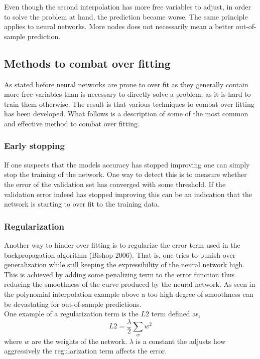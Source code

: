 \documentclass[11pt, letterpaper]{amsart}
\begin{document}
Even though the second interpolation has more free variables to adjust, in order to solve the problem at hand, the prediction became worse. The same principle applies to neural networks. More nodes does not necessarily mean a better out-of-sample prediction.

\subsection{Methods to combat over fitting}
As stated before neural networks are prone to over fit as they generally contain more free variables than is necessary to directly solve a problem, as it is hard to train them otherwise. The result is that various techniques to combat over fitting has been developed. What follows is a description of some of the most common and effective method to combat over fitting.

\subsubsection{Early stopping}
If one suspects that the models accuracy has stopped improving one can simply stop the training of the network. One way to detect this is to measure whether the error of the validation set has converged with some threshold. If the validation error indeed has stopped improving this can be an indication that the network is starting to over fit to the training data.

\subsubsection{Regularization}
Another way to hinder over fitting is to regularize the error term used in the backpropagation algorithm (Bishop 2006). That is, one tries to punish over generalization while still keeping the expressibility of the neural network high.
\\

This is achieved by adding some penalizing term to the error function thus reducing the smoothness of the curve produced by the neural network. As seen in the polynomial interpolation example above a too high degree of smoothness can be devastating for out-of-sample predictions.
\\

One example of a regularization term is the $L2$ term defined as,
\begin{equation}
L2 = \frac{\lambda}{2} \sum_w w^2
\end{equation}
where $w$ are the weights of the network. $\lambda$ is a constant the adjusts how aggressively the regularization term affects the error.
\\
\end{document}
